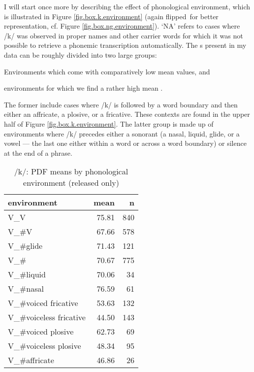 I will start once more by describing the effect of phonological environment, which is illustrated in Figure \ref{fig.box.k.environment} (again flipped\ for better representation, cf. Figure \ref{fig.box.ng.environment}).
`NA' refers to cases where /k/ was observed in proper names and other carrier words for which it was not possible to retrieve a phonemic transcription automatically.
The s present in my data can be roughly divided into two large groups:
\begin{inparaenum}[(1)]
	\item Environments which come with comparatively low mean  values, and
	\item environments for which we find a rather high mean .
\end{inparaenum}
The former include cases where /k/ is followed by a word boundary and then either an affricate, a plosive, or a fricative.
These contexts are found in the upper half of Figure \ref{fig.box.k.environment}.
The latter group is made up of environments where /k/ precedes either a sonorant (a nasal, liquid, glide, or a vowel --- the last one either within a word or across a word boundary) or silence at the end of a phrase.

\begin{table}[h]
	\centering
	\caption{/k/: PDF means by phonological environment (released only)}
	\label{tab.k.mean.environment}
	\begin{tabular}{lrr}
		\hline
		environment & mean \isi{PDF} & n\\
		\hline
		V\_V & 75.81 & 840\\
		V\_\#V & 67.66 & 578\\
		V\_\#glide & 71.43 & 121\\
		V\_\# & 70.67 & 775\\
		V\_\#liquid & 70.06 & 34\\
		V\_\#nasal & 76.59 & 61\\
		V\_\#voiced fricative & 53.63 & 132\\
		V\_\#voiceless fricative & 44.50 & 143\\
		V\_\#voiced plosive & 62.73 & 69\\
		V\_\#voiceless plosive & 48.34 & 95\\
		V\_\#affricate & 46.86 & 26\\
		\hline
	\end{tabular}
\end{table}

